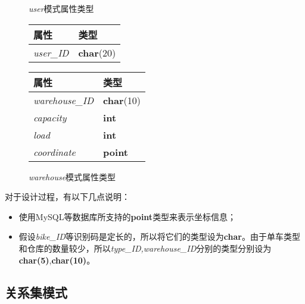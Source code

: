 \begin{figure}[!htp]
    \begin{minipage}{0.45\textwidth}
      \centering
      \caption{\textit{user}模式属性类型}
      \label{tab:user}
      \begin{tabular}{ll}\toprule
        属性&类型\\\midrule
       \textit{user\_ID}&\textbf{char}(20)\\
       \bottomrule
      \end{tabular}
    \end{minipage}\hfill
    \begin{minipage}{0.45\textwidth}
      \centering
      \caption{\textit{warehouse}模式属性类型}
      \label{tab:warehouse}
      \begin{tabular}{ll}\toprule
        属性&类型\\\midrule
       \textit{warehouse\_ID}&\textbf{char}(10)\\
       \textit{capacity}&\textbf{int}\\
       \textit{load}&\textbf{int}\\
       \textit{coordinate}&\textbf{point}\\
       \bottomrule
      \end{tabular}
    \end{minipage}\hfill
  \end{figure}

对于设计过程，有以下几点说明：
\begin{itemize}
    \item 使用MySQL等数据库所支持的\textbf{point}类型来表示坐标信息；
    \item 假设\textit{bike\_ID}等识别码是定长的，所以将它们的类型设为\textbf{char}。由于单车类型和仓库的数量较少，所以\textit{type\_ID,warehouse\_ID}分别的类型分别设为\textbf{char(5)},\textbf{char(10)}。
\end{itemize}
\subsection{关系集模式}
